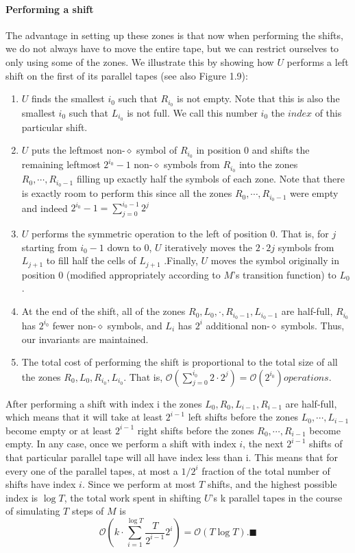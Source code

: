 \documentclass[a4paper]{article}
\begin{document}
\paragraph{Performing a shift}
The advantage in setting up these zones is that now when performing the shifts, we do
not always have to move the entire tape, but we can restrict ourselves to only using
some of the zones. We illustrate this by showing how $U$ performs a left shift on the first
of its parallel tapes (see also Figure 1.9):
\begin{enumerate}
\item $U$ finds the smallest $i_0$ such that $R_{i_0}$ is not empty. Note that this is also the smallest $i_0$ such that $L_{i_0}$ is not full. We call this number $i_0$ the $index$ of this particular shift.
\item $U$ puts the leftmost non-$\diamond$ symbol of $R_{i_0}$ in position 0 and shifts the remaining leftmost $2^{i_0} − 1$ non-$\diamond$ symbols from $R_{i_0}$ into the zones $R_0 ,\cdots , R_{i_0 −1}$ filling up exactly half the symbols of each zone. Note that there is exactly room to perform this since all the zones $R_0 ,\cdots , R_{i_0 −1}$ were empty and indeed $2^{i_0}-1 = \sum_{j=0}^{i_0-1} 2^{j}$
\item $U$ performs the symmetric operation to the left of position 0. That is, for $j$ starting from $i_0 −1$ down to 0, $U$ iteratively moves the $2 \cdot 2 j$ symbols from $L_{j+1}$ to fill half the cells of $L_{j+1}$ .Finally, $U$ moves the symbol originally in position 0 (modified appropriately according to $M$’s transition function) to $L_0$.
\item At the end of the shift, all of the zones $R_0 , L_0 , \cdot , R_{i_0 −1} , L_{i_0 −1}$ are half-full, $R_{i_0}$ has $2^{i_0}$ fewer non-$\diamond$ symbols, and $L_i$ has $2^i$ additional non-$\diamond$ symbols. Thus, our invariants are maintained.
\item
The total cost of performing the shift is proportional to the total size of all the zones $R_0 , L_0, R_{i_0} , L_{i_0}$. That is,  $\mathcal{O}( \sum_{j=0}^{i_0} 2 \cdot 2^{j}) = \mathcal{O}(2^{i_0}) operations.$
\end{enumerate}

After performing a shift with index i the zones $L_0 , R_0, L_{i-1} , R_{i-1}$ are half-full,
which means that it will take at least $2^{i − 1}$ left shifts before the zones $L_0, \cdots , L_{i-1}$ become empty or at least $2^{i − 1}$ right shifts before the zones $R_0, \cdots , R_{i-1}$ become
empty. In any case, once we perform a shift with index $i$, the next $2^{i − 1}$ shifts of that
particular parallel tape will all have index less than i. This means that for every one
of the parallel tapes, at most a $1/2^i$ fraction of the total number of shifts have index
$i$. Since we perform at most $T$ shifts, and the highest possible index is $\log T$, the total
work spent in shifting $U$’s k parallel tapes in the course of simulating $T$ steps of $M$ is
$$  \mathcal{O}( k \cdot \sum_{i=1}^{\log T} \frac{T}{2^{i-1}} 2^{i}) = \mathcal{O}(T\log T).\blacksquare $$
\end{document}
